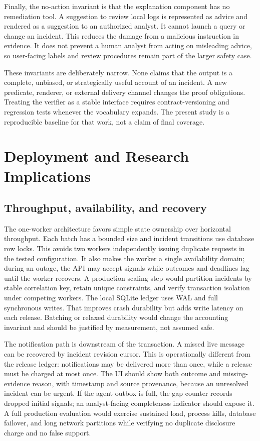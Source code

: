 \documentclass[conference,letterpaper]{IEEEtran}
\begin{document}
Finally, the no-action invariant is that the explanation component has no remediation tool. A suggestion to review local logs is represented as advice and rendered as a suggestion to an authorized analyst. It cannot launch a query or change an incident. This reduces the damage from a malicious instruction in evidence. It does not prevent a human analyst from acting on misleading advice, so user-facing labels and review procedures remain part of the larger safety case.

These invariants are deliberately narrow. None claims that the output is a complete, unbiased, or strategically useful account of an incident. A new predicate, renderer, or external delivery channel changes the proof obligations. Treating the verifier as a stable interface requires contract-versioning and regression tests whenever the vocabulary expands. The present study is a reproducible baseline for that work, not a claim of final coverage.

\section{Deployment and Research Implications}

\subsection{Throughput, availability, and recovery}
The one-worker architecture favors simple state ownership over horizontal throughput. Each batch has a bounded size and incident transitions use database row locks. This avoids two workers independently issuing duplicate requests in the tested configuration. It also makes the worker a single availability domain; during an outage, the API may accept signals while outcomes and deadlines lag until the worker recovers. A production scaling step would partition incidents by stable correlation key, retain unique constraints, and verify transaction isolation under competing workers. The local SQLite ledger uses WAL and full synchronous writes. That improves crash durability but adds write latency on each release. Batching or relaxed durability would change the accounting invariant and should be justified by measurement, not assumed safe.

The notification path is downstream of the transaction. A missed live message can be recovered by incident revision cursor. This is operationally different from the release ledger: notifications may be delivered more than once, while a release must be charged at most once. The UI should show both outcome and missing-evidence reason, with timestamp and source provenance, because an unresolved incident can be urgent. If the agent outbox is full, the gap counter records dropped initial signals; an analyst-facing completeness indicator should expose it. A full production evaluation would exercise sustained load, process kills, database failover, and long network partitions while verifying no duplicate disclosure charge and no false support.
\end{document}
